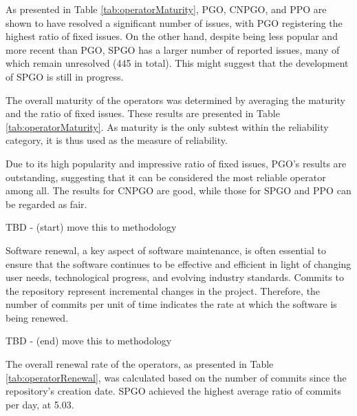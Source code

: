 As presented in Table \ref{tab:operatorMaturity}, PGO, CNPGO, and PPO are shown to have resolved a significant number of issues, with PGO registering the highest ratio of fixed issues. On the other hand, despite being less popular and more recent than PGO, SPGO has a larger number of reported issues, many of which remain unresolved (445 in total). This might suggest that the development of SPGO is still in progress.

The overall maturity of the operators was determined by averaging the maturity and the ratio of fixed issues.
These results are presented in Table \ref{tab:operatorMaturity}.
As maturity is the only subtest within the reliability category, it is thus used as the measure of reliability.

Due to its high popularity and impressive ratio of fixed issues, PGO's results are outstanding, suggesting that it can be considered the most reliable operator among all.
The results for CNPGO are good, while those for SPGO and PPO can be regarded as fair.


TBD - (start) move this to methodology

Software renewal, a key aspect of software maintenance, is often essential to ensure that the software continues to be effective and efficient in light of changing user needs, technological progress, and evolving industry standards. Commits to the repository represent incremental changes in the project. Therefore, the number of commits per unit of time indicates the rate at which the software is being renewed.

TBD - (end) move this to methodology

The overall renewal rate of the operators, as presented in Table \ref{tab:operatorRenewal}, was calculated based on the number of commits since the repository's creation date. SPGO achieved the highest average ratio of commits per day, at 5.03.

